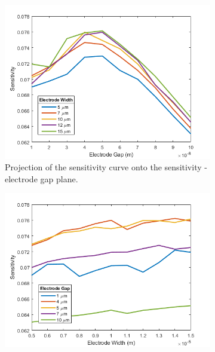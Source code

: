 \begin{figure}[h]
\begin{subfigure}[t]{0.49\textwidth}
    \end{subfigure}
    \\
    \vspace{0.1 in}
    \begin{subfigure}[t]{0.49\textwidth}
        \centering
        \includegraphics[width=\textwidth]{images/comsol_simple_gapXsensitivity.png}
        \caption{Projection of the sensitivity curve onto the sensitivity - electrode gap plane.}
        \label{fig:simple_sensitivity_gap}
    \end{subfigure}
    \hfill
    \begin{subfigure}[t]{0.49\textwidth}
        \centering
        \includegraphics[width=\textwidth]{images/comsol_simple_widthXsensitivity.png}

\end{subfigure}
\end{figure}
